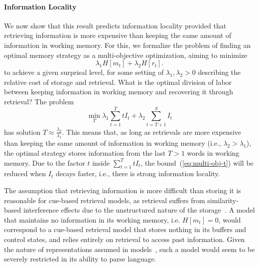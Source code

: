 \documentclass[11pt,letterpaper]{article}
\begin{document}
\paragraph{Information Locality}
We now show that this result predicts information locality provided that retrieving information is more expensive than keeping the same amount of information in working memory.
For this, we formalize the problem of finding an optimal memory strategy as a multi-objective optimization, aiming to minimize
\begin{equation}
	\lambda_1 H[m_t] + \lambda_2 H[r_t].
\end{equation}
to achieve a given surprisal level, for some setting of $\lambda_1, \lambda_2 > 0$ describing the relative cost of storage and retrieval.
What is the optimal division of labor between keeping information in working memory and recovering it through retrieval?
The problem
\begin{equation}\label{eq:multi-obj-t}
	\min_{T} \lambda_1 \sum_{t=1}^T t I_t + \lambda_2 \sum_{t=T+1}^S I_t
\end{equation}
has solution $T \approx \frac{\lambda_2}{\lambda_1}$. %
This means that, as long as retrievals are more expensive than keeping the same amount of information in working memory (i.e., $\lambda_2 > \lambda_1$), the optimal strategy stores information from the last $T > 1$ words in working memory.
Due to the factor $t$ inside $\sum_{t=1}^T t I_t$, the bound~(\ref{eq:multi-obj-t}) will be reduced when $I_t$ decays faster, i.e., there is strong information locality.

The assumption that retrieving information is more difficult than storing it is reasonable for cue-based retrieval models, as retrieval suffers from similarity-based interference effects due to the unstructured nature of the storage~\citep{lewis-activation-based-2005}.
A model that maintains no information in its working memory, i.e. $H[m_t]=0$, would correspond to a cue-based retrieval model that stores nothing in its buffers and control states, and relies entirely on retrieval to access past information.
Given the nature of representations assumed in models~\citep{lewis-activation-based-2005}, such a model would seem to be severely restricted in its ability to parse language.

\end{document}
